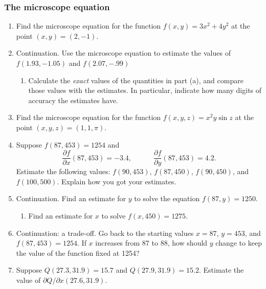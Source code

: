 \subsubsection{The microscope equation}
\label{subsubsec:the-microscope-equation}



\begin{enumerate}
\item Find the microscope equation for the function $f(x, y) = 3 x^2 +
4 y^2$ at the point $(x, y) = (2, -1)$.


\item Continuation.  Use the microscope equation to estimate the
values of $f(1.93, -1.05)$ and $f(2.07, -.99)$


  \begin{enumerate}
  \item Calculate the {\em exact\/} values of the quantities in part (a),
and compare those values with the estimates.  In particular, indicate
how many digits of accuracy the estimates have.


\end{enumerate}
\item Find the microscope equation for the function $f(x, y, z) = x^2 y
\sin{z}$ at the point $(x, y, z) = (1, 1, \pi)$.


\item Suppose $f(87, 453) = 1254$ and
	\[
\dfrac{\partial f}{\partial x}(87, 453) = -3.4, \qquad \quad
		\dfrac{\partial f}{\partial y}(87, 453) = 4.2.
\]
Estimate the following values: $f(90, 453)$, $f(87, 450)$, $f(90,
450)$, and $f(100, 500)$.  Explain how you got your estimates.


\item Continuation.  Find an estimate for $y$ to solve the equation
$f(87, y) = 1250$.

  \begin{enumerate}
  \item Find an estimate for $x$ to solve $f(x, 450) = 1275$.


\end{enumerate}
\item Continuation: a trade-off.  Go back to the starting values $x =
87$, $y = 453$, and $f(87, 453) = 1254$.  If $x$ increases from 87 to
88, how should $y$ change to keep the value of the function fixed at
1254?


\item Suppose $Q(27.3, 31.9) = 15.7$ and $Q(27.9, 31.9) = 15.2$.
Estimate the value of $\partial Q/\partial x(27.6, 31.9)$.


\end{enumerate}
